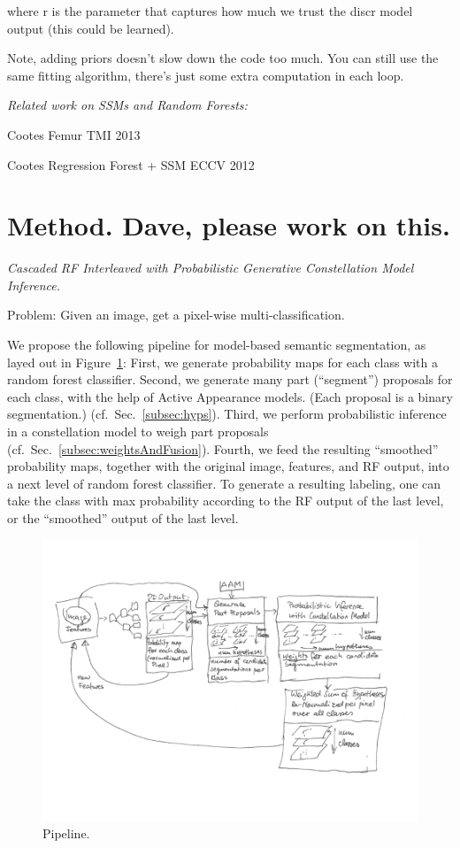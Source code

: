 \documentclass[10pt,twocolumn,letterpaper]{article}
\begin{document}
where r is the parameter that captures how much we trust the discr model output (this could be learned). 

Note, adding priors doesn't slow down the code too much.  You can still use the same fitting algorithm, there's just some extra computation in each loop.

\emph{Related work on SSMs and Random Forests: }

Cootes Femur TMI 2013~\cite{CootesFemurTMI2013}

Cootes Regression Forest + SSM ECCV 2012~\cite{CootesECCV2012RRFandSSM}



\section{Method. Dave, please work on this.}
\emph{Cascaded RF Interleaved with Probabilistic Generative Constellation Model Inference.}

Problem: Given an image, get a pixel-wise multi-classification. 

We propose the following pipeline for model-based semantic segmentation, as layed out in Figure~\ref{fig:pipeline}: 
%
First, we generate probability maps for each class with a random forest classifier.
%
Second, we generate many part ("`segment"') proposals for each class, with the help of Active Appearance models. 
(Each proposal is a binary segmentation.) (cf.\ Sec.\ \ref{subsec:hyps}). 
%
Third, we perform probabilistic inference in a constellation model to weigh part proposals (cf.\ Sec.\ \ref{subsec:weightsAndFusion}). 
%
Fourth, we feed the resulting "`smoothed"' probability maps, together with the original image, features, and RF output, into a next level of random forest classifier. 
%
To generate a resulting labeling, one can take the class with max probability according to the RF output of the last level, or the "`smoothed"' output of the last level. 


\begin{figure}[t]
\begin{center}
\includegraphics[width=\textwidth]{Pipeline.png} %
\caption{Pipeline.}
\label{fig:pipeline}
\end{center}
\end{figure}
\end{document}
